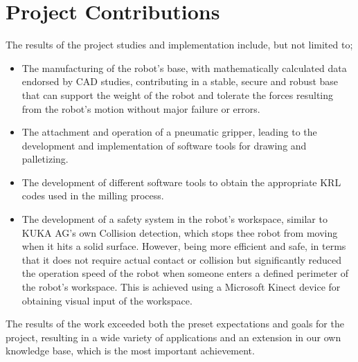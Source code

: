 \section{Project Contributions}
The results of the project studies and implementation include, but not limited to; 
\begin{itemize}
\item	The manufacturing of the robot’s base, with mathematically calculated data endorsed by CAD studies, contributing in a stable, secure and robust base that can support the weight of the robot and tolerate the forces resulting from the robot’s motion without major failure or errors.

\item	The attachment and operation of a pneumatic gripper, leading to the development and implementation of software tools for drawing and palletizing.

\item	The development of different software tools to obtain the appropriate KRL codes used in the milling process.

\item	The development of a safety system in the robot’s workspace, similar to KUKA AG’s own Collision detection, which stops thee robot from moving when it hits a solid surface. However, being more efficient and safe, in terms that it does not require actual contact or collision but significantly reduced the operation speed of the robot when someone enters a defined perimeter of the robot’s workspace. This is achieved using a Microsoft Kinect device for obtaining visual input of the workspace.
\end{itemize}

The results of the work exceeded both the preset expectations and goals for the project, resulting in a wide variety of applications and an extension in our own knowledge base, which is the most important achievement. 



%
